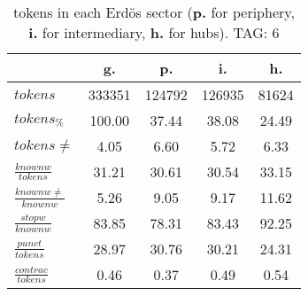 \begin{table}[h!]
\begin{center}
\begin{tabular}{| l | c | c | c | c |}\hline
 & g. & p. & i. & h. \\\hline
$tokens$ & 333351  & 124792  & 126935  & 81624 \\\hline
$tokens_{\%}$ & 100.00  & 37.44  & 38.08  & 24.49 \\\hline
$tokens \neq$ & 4.05  & 6.60  & 5.72  & 6.33 \\\hline
$\frac{knownw}{tokens}$ & 31.21  & 30.61  & 30.54  & 33.15 \\\hline
$\frac{knownw \neq}{knownw}$ & 5.26  & 9.05  & 9.17  & 11.62 \\\hline
$\frac{stopw}{knownw}$ & 83.85  & 78.31  & 83.43  & 92.25 \\\hline
$\frac{punct}{tokens}$ & 28.97  & 30.76  & 30.21  & 24.31 \\\hline
$\frac{contrac}{tokens}$ & 0.46  & 0.37  & 0.49  & 0.54 \\\hline
\end{tabular}
\caption{tokens in each Erd\"os sector ({{\bf p.}} for periphery, {{\bf i.}} for intermediary, 
    {{\bf h.}} for hubs). TAG: 6}
\end{center}
\end{table}